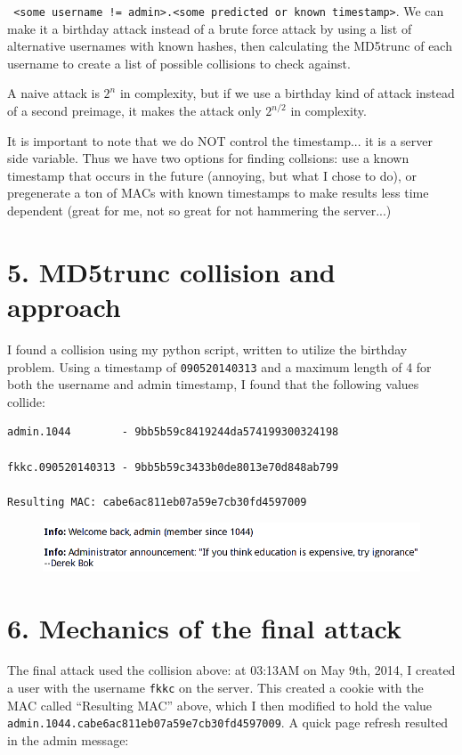 \documentclass[12pt,letterpaper]{article}
\begin{document}
\verb~ <some username != admin>.<some predicted or known timestamp>~. We can
make it a birthday attack instead of a brute force attack by using a list of
alternative usernames with known hashes, then calculating the MD5trunc of each
username to create a list of possible collisions to check against.

A naive attack is $2^n$ in complexity, but if we use a birthday kind of attack
instead of a second preimage, it makes the attack only $2^{n/2}$ in complexity.

It is important to note that we do NOT control the timestamp... it is a server
side variable. Thus we have two options for finding collsions: use a known
timestamp that occurs in the future (annoying, but what I chose to do), or
pregenerate a ton of MACs with known timestamps to make results less time
dependent (great for me, not so great for not hammering the server...)

\section*{5. MD5trunc collision and approach}
I found a collision using my python script, written to utilize the birthday
problem. Using a timestamp of \verb~090520140313~ and a maximum length of 4
for both the username and admin timestamp, I found that the following
values collide:
\begin{verbatim}
admin.1044        - 9bb5b59c8419244da574199300324198

fkkc.090520140313 - 9bb5b59c3433b0de8013e70d848ab799

Resulting MAC: cabe6ac811eb07a59e7cb30fd4597009
\end{verbatim}

\begin{figure}[H]
\centering
\includegraphics[width=5in]{admin4.png}
\end{figure}

\section*{6. Mechanics of the final attack}
The final attack used the collision above: at 03:13AM on May 9th, 2014, I created
a user with the username \verb~fkkc~ on the server. This created a cookie
with the MAC called ``Resulting MAC'' above, which I then modified to hold
the value \verb~admin.1044.cabe6ac811eb07a59e7cb30fd4597009~. A quick page
refresh resulted in the admin message:
\end{document}

